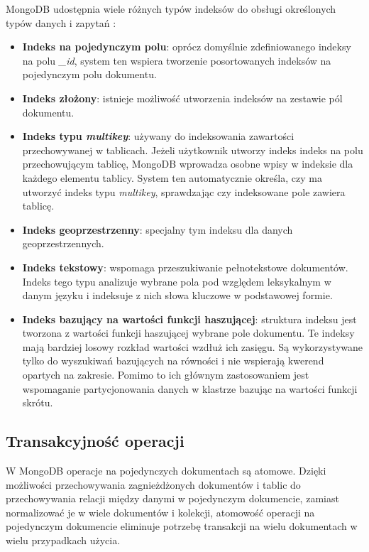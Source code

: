 MongoDB udostępnia wiele różnych typów indeksów do obsługi określonych typów danych i zapytań \cite{MongoDBIndexes}:
\begin{itemize}
    \item \textbf{Indeks na pojedynczym polu}: oprócz domyślnie zdefiniowanego indeksy na polu \textit{\_id}, system ten wspiera tworzenie posortowanych indeksów na pojedynczym polu dokumentu.
    \item \textbf{Indeks złożony}: istnieje możliwość utworzenia indeksów na zestawie pól dokumentu.
    \item \textbf{Indeks typu \textit{multikey}}: używany do indeksowania zawartości przechowywanej w tablicach.
    Jeżeli użytkownik utworzy indeks indeks na polu przechowującym tablicę, MongoDB wprowadza osobne wpisy w indeksie dla każdego elementu tablicy.
    System ten automatycznie określa, czy ma utworzyć indeks typu \textit{multikey}, sprawdzając czy indeksowane pole zawiera tablicę.
    \item \textbf{Indeks geoprzestrzenny}: specjalny tym indeksu dla danych geoprzestrzennych.
    \item \textbf{Indeks tekstowy}: wspomaga przeszukiwanie pełnotekstowe dokumentów.
    Indeks tego typu analizuje wybrane pola pod względem leksykalnym w danym języku i indeksuje z nich słowa kluczowe w podstawowej formie.
    \item \textbf{Indeks bazujący na wartości funkcji haszującej}: struktura indeksu jest tworzona z wartości funkcji haszującej wybrane pole dokumentu.
    Te indeksy mają bardziej losowy rozkład wartości wzdłuż ich zasięgu. 
    Są wykorzystywane tylko do wyszukiwań bazujących na równości i nie wspierają kwerend opartych na zakresie.
    Pomimo to ich głównym zastosowaniem jest wspomaganie partycjonowania danych w klastrze bazując na wartości funkcji skrótu.
\end{itemize}

\subsection{Transakcyjność operacji}

W MongoDB operacje na pojedynczych dokumentach są atomowe.
Dzięki możliwości przechowywania zagnieżdżonych dokumentów i tablic do przechowywania relacji między danymi w pojedynczym dokumencie, zamiast normalizować je w wiele dokumentów i kolekcji, atomowość operacji na pojedynczym dokumencie eliminuje potrzebę transakcji na wielu dokumentach w wielu przypadkach użycia.

